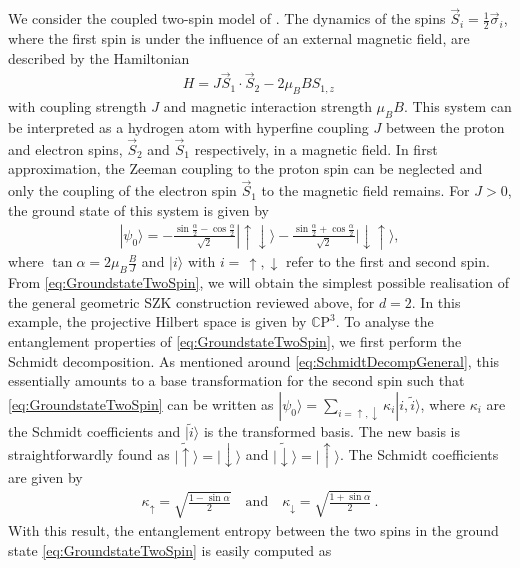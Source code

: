 \documentclass[a4paper,11pt]{article}
\newcommand{\CP}[1]{\mathds{C}\text{P}^{#1}}
\newcommand{\1}{\mathds{1}}
\begin{document}
We consider the coupled two-spin model of \cite{Nogueira:2021ngh}. The dynamics of the spins $\vec{S}_i=\frac{1}{2}\vec{\sigma}_i$, where the first spin is under the influence of an external magnetic field, are described by the Hamiltonian
\begin{align}
    H=J\vec{S}_1\cdot\vec{S}_2-2\mu_BBS_{1,z}\,\label{eq:TwoSpinHamiltonian}
\end{align}
with coupling strength $J$ and magnetic interaction strength $\mu_BB$. This system can be interpreted as a hydrogen atom with hyperfine coupling $J$ between the proton and electron spins, $\vec{S}_2$ and $\vec{S}_1$ respectively, in a magnetic field. In first approximation, the Zeeman coupling to the proton spin can be neglected and only the coupling of the electron spin $\vec{S}_1$ to the magnetic field remains. For $J>0$, the ground state of this system is given by
\begin{align}
    |\psi_0\rangle=-\frac{\sin\frac{\alpha}{2}-\cos\frac{\alpha}{2}}{\sqrt{2}}|\!\uparrow\downarrow\rangle-\frac{\sin\frac{\alpha}{2}+\cos\frac{\alpha}{2}}{\sqrt{2}}|\!\downarrow\uparrow\rangle,\label{eq:GroundstateTwoSpin}
\end{align}
where $\tan\alpha=2\mu_B\frac{B}{J}$ and $|i\rangle$ with $i=\,\uparrow,\downarrow$ refer to the first and second spin. From \eqref{eq:GroundstateTwoSpin}, we will obtain the simplest possible realisation of the general geometric SZK construction \cite{Sinolecka2002manifolds} reviewed above, for $d=2$. In this example, the projective Hilbert space is given by $\CP{3}$. To analyse the entanglement properties of \eqref{eq:GroundstateTwoSpin}, we first perform the Schmidt decomposition. As mentioned around \eqref{eq:SchmidtDecompGeneral}, this essentially amounts to a base transformation for the second spin such that \eqref{eq:GroundstateTwoSpin} can be written as $|\psi_0\rangle=\sum_{i=\uparrow,\downarrow}\kappa_i|i,\tilde{i}\rangle$, where $\kappa_i$ are the Schmidt coefficients and $|\tilde{i}\rangle$ is the transformed basis. The new basis is straightforwardly found as $|\tilde{\uparrow}\rangle=|\!\!\downarrow\rangle$ and $|\tilde{\downarrow}\rangle=|\!\!\uparrow\rangle$. The Schmidt coefficients are given by
\begin{align}
    \kappa_\uparrow=\sqrt{\frac{1-\sin\alpha}{2}}\quad\text{and}\quad\kappa_\downarrow=\sqrt{\frac{1+\sin\alpha}{2}}\,.\label{eq:SchmidtCoeffTwoSpin}
\end{align}
With this result, the entanglement entropy between the two spins in the ground state \eqref{eq:GroundstateTwoSpin} is easily computed as
\end{document}
